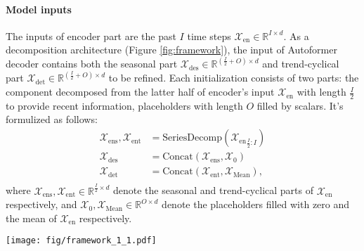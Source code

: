 \paragraph{Model inputs} The inputs of encoder part are the past $I$ time steps $\mathcal{X}_{\mathrm{en}}\in\mathbb{R}^{I\times d}$.
As a decomposition architecture (Figure \ref{fig:framework}), the input of Autoformer decoder contains both the seasonal part $\mathcal{X}_{\mathrm{des}} \in\mathbb{R}^{(\frac{I}{2}+O)\times d}$ and trend-cyclical part $\mathcal{X}_{\mathrm{det}} \in\mathbb{R}^{(\frac{I}{2}+O)\times d}$ to be refined. Each initialization consists of two parts: the component decomposed from the latter half of encoder's input $\mathcal{X}_{\mathrm{en}}$ with length $\frac{I}{2}$ to provide recent information, placeholders with length $O$ filled by scalars. It's formulized as follows:\begin{equation}\label{equ:model_inputs}
  \begin{split}
  \mathcal{X}_{\mathrm{ens}}, \mathcal{X}_{\mathrm{ent}} &= \mathrm{SeriesDecomp}({\mathcal{X}_{\mathrm{en}}}_{\frac{I}{2}:I}) \\
  \mathcal{X}_{\mathrm{des}} & = \mathrm{Concat}(\mathcal{X}_{\mathrm{ens}}, \mathcal{X}_{0}) \\
  \mathcal{X}_{\mathrm{det}} & = \mathrm{Concat}(\mathcal{X}_{\mathrm{ent}}, \mathcal{X}_{\mathrm{Mean}}), \\
  \end{split}
\end{equation}
where $\mathcal{X}_{\mathrm{ens}},\mathcal{X}_{\mathrm{ent}}\in\mathbb{R}^{\frac{I}{2}\times d}$ denote the seasonal and trend-cyclical parts of $\mathcal{X}_{\mathrm{en}}$ respectively, and $\mathcal{X}_{0},\mathcal{X}_{\mathrm{Mean}}\in\mathbb{R}^{O\times d}$ denote the placeholders filled with zero and the mean of $\mathcal{X}_{\mathrm{en}}$ respectively.

\begin{figure*}
\begin{center}
	\centerline{\texttt{[image: fig/framework\_1\_1.pdf]}}
	\caption{Autoformer architecture. The encoder eliminates the long-term trend-cyclical part by series decomposition blocks (\textcolor{blue}{blue} blocks) and focuses on seasonal patterns modeling. The decoder accumulates the trend part extracted from hidden variables progressively. The past seasonal information from encoder is utilized by the encoder-decoder Auto-Correlation (center \textcolor[rgb]{0.15,0.7,0.15}{green} block in decoder). }
	\label{fig:framework}
	\vspace{-20pt}
\end{center}
\end{figure*}

